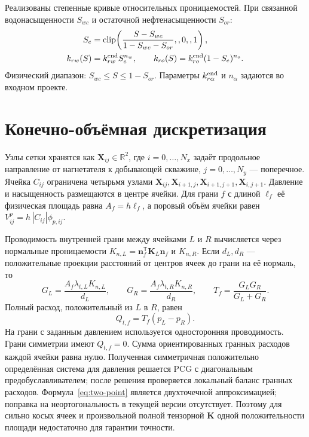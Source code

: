 \documentclass[12pt,a4paper]{article}
\begin{document}
Реализованы степенные кривые относительных проницаемостей. При связанной
водонасыщенности $S_{wc}$ и остаточной нефтенасыщенности $S_{or}$:
\begin{align}
 S_e&=\operatorname{clip}\!\left(
    \frac{S-S_{wc}}{1-S_{wc}-S_{or}},,0,,1\right),\\
 k_{rw}(S)&=k_{rw}^{\rm end}S_e^{n_w},\qquad
 k_{ro}(S)=k_{ro}^{\rm end}(1-S_e)^{n_o}.
 \label{eq:relperm}
\end{align}
Физический диапазон: $S_{wc}\le S\le 1-S_{or}$. Параметры
$k_{r\alpha}^{\rm end}$ и $n_\alpha$ задаются во входном проекте.

\section{Конечно-объёмная дискретизация}

Узлы сетки хранятся как $\mathbf X_{ij}\in\mathbb R^2$, где
$i=0,\ldots,N_x$ задаёт продольное направление от нагнетателя к добывающей
скважине, $j=0,\ldots,N_y$ --- поперечное. Ячейка
$C_{ij}$ ограничена четырьмя узлами
$\mathbf X_{ij},\mathbf X_{i+1,j},\mathbf X_{i+1,j+1},\mathbf X_{i,j+1}$.
Давление и насыщенность размещаются в центре ячейки. Для грани $f$ с длиной
$\ell_f$ её физическая площадь равна $A_f=h\ell_f$, а поровый объём ячейки
равен $V^p_{ij}=h\,|C_{ij}|\phi_{p,ij}$.

Проводимость внутренней грани между ячейками $L$ и $R$ вычисляется через
нормальные проницаемости $K_{n,L}=\mathbf n_f^\mathsf T\mathbf K_L\mathbf n_f$
и $K_{n,R}$. Если $d_L,d_R$ --- положительные проекции расстояний от центров
ячеек до грани на её нормаль, то
\begin{equation}
 G_L=\frac{A_f\lambda_{t,L}K_{n,L}}{d_L},\qquad
 G_R=\frac{A_f\lambda_{t,R}K_{n,R}}{d_R},\qquad
 T_f=\frac{G_LG_R}{G_L+G_R}.
 \label{eq:transmissibility}
\end{equation}
Полный расход, положительный из $L$ в $R$, равен
\begin{equation}
 Q_{t,f}=T_f(p_L-p_R).
 \label{eq:two-point}
\end{equation}
На грани с заданным давлением используется односторонняя проводимость.
Грани симметрии имеют $Q_{t,f}=0$. Сумма ориентированных гранных расходов
каждой ячейки равна нулю. Полученная симметричная положительно определённая
система для давления решается PCG с диагональным предобуславливателем;
после решения проверяется локальный баланс гранных расходов.
Формула~\eqref{eq:two-point} является двухточечной аппроксимацией;
поправка на неортогональность в текущей версии отсутствует. Поэтому для
сильно косых ячеек и произвольной полной тензорной $\mathbf K$ одной
положительности площади недостаточно для гарантии точности.
\end{document}
